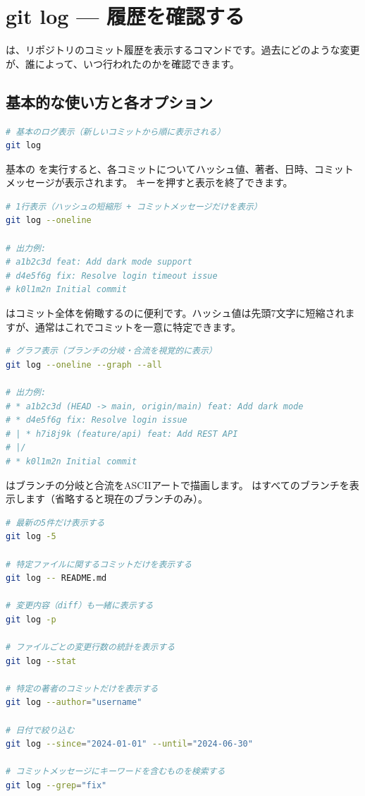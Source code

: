 \section{git log — 履歴を確認する}

 は、リポジトリのコミット履歴を表示するコマンドです。過去にどのような変更が、誰によって、いつ行われたのかを確認できます。

\subsection{基本的な使い方と各オプション}

\begin{lstlisting}[language=bash]
# 基本のログ表示（新しいコミットから順に表示される）
git log
\end{lstlisting}

基本の  を実行すると、各コミットについてハッシュ値、著者、日時、コミットメッセージが表示されます。 キーを押すと表示を終了できます。

\begin{lstlisting}[language=bash]
# 1行表示（ハッシュの短縮形 + コミットメッセージだけを表示）
git log --oneline

# 出力例:
# a1b2c3d feat: Add dark mode support
# d4e5f6g fix: Resolve login timeout issue
# k0l1m2n Initial commit
\end{lstlisting}

 はコミット全体を俯瞰するのに便利です。ハッシュ値は先頭7文字に短縮されますが、通常はこれでコミットを一意に特定できます。

\begin{lstlisting}[language=bash]
# グラフ表示（ブランチの分岐・合流を視覚的に表示）
git log --oneline --graph --all

# 出力例:
# * a1b2c3d (HEAD -> main, origin/main) feat: Add dark mode
# * d4e5f6g fix: Resolve login issue
# | * h7i8j9k (feature/api) feat: Add REST API
# |/
# * k0l1m2n Initial commit
\end{lstlisting}

 はブランチの分岐と合流をASCIIアートで描画します。 はすべてのブランチを表示します（省略すると現在のブランチのみ）。

\begin{lstlisting}[language=bash]
# 最新の5件だけ表示する
git log -5

# 特定ファイルに関するコミットだけを表示する
git log -- README.md

# 変更内容（diff）も一緒に表示する
git log -p

# ファイルごとの変更行数の統計を表示する
git log --stat

# 特定の著者のコミットだけを表示する
git log --author="username"

# 日付で絞り込む
git log --since="2024-01-01" --until="2024-06-30"

# コミットメッセージにキーワードを含むものを検索する
git log --grep="fix"
\end{lstlisting}

